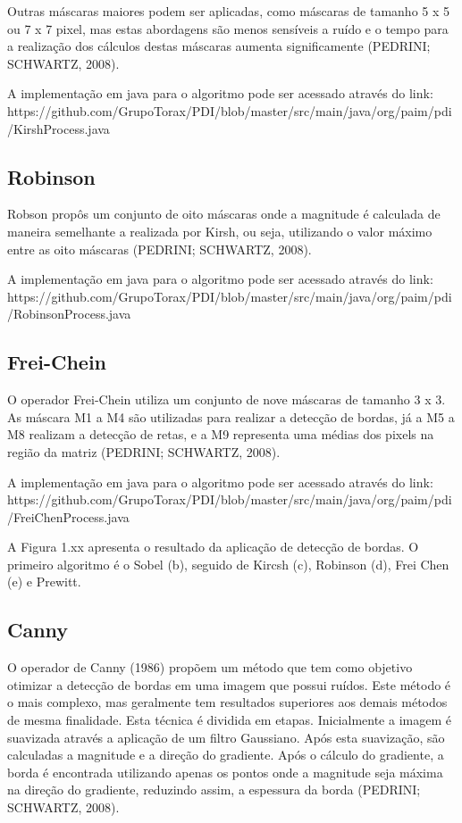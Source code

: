 \documentclass[
	12pt,				%
	oneside,			%
	a4paper,			%
	english,			%
	french,				%
	spanish,			%
	brazil,				%
	]{abntex2}
\begin{document}
Outras máscaras maiores podem ser aplicadas, como máscaras de tamanho 5 x 5 ou 7 x 7 pixel, mas estas abordagens são menos sensíveis a ruído e o tempo para a realização dos cálculos destas máscaras aumenta significamente (PEDRINI; SCHWARTZ, 2008).

A implementação em java para o algoritmo pode ser acessado através do link:
https://github.com/GrupoTorax/PDI/blob/master/src/main/java/org/paim/pdi/KirshProcess.java 

\subsection{Robinson}
Robson propôs um conjunto de oito máscaras onde a magnitude é calculada de maneira semelhante a realizada por Kirsh, ou seja, utilizando o valor máximo entre as oito máscaras (PEDRINI; SCHWARTZ, 2008). 

 A implementação em java para o algoritmo pode ser acessado através do link:
https://github.com/GrupoTorax/PDI/blob/master/src/main/java/org/paim/pdi/RobinsonProcess.java 

\subsection{Frei-Chein}
O operador Frei-Chein utiliza um conjunto de nove máscaras de tamanho 3 x 3. As máscara M1 a M4 são utilizadas para realizar a detecção de bordas, já a M5 a M8 realizam a detecção de retas, e a M9 representa uma médias dos pixels na região da matriz (PEDRINI; SCHWARTZ, 2008). 

A implementação em java para o algoritmo pode ser acessado através do link:
https://github.com/GrupoTorax/PDI/blob/master/src/main/java/org/paim/pdi/FreiChenProcess.java 

A Figura 1.xx apresenta o resultado da aplicação de detecção de bordas. O primeiro algoritmo é o Sobel (b), seguido de Kircsh (c), Robinson (d), Frei Chen (e) e Prewitt.

\subsection{Canny}

O operador de Canny (1986) propõem um método que tem como objetivo otimizar a detecção de bordas em uma imagem que possui ruídos. Este método é o mais complexo, mas geralmente tem resultados superiores aos demais métodos de mesma finalidade. Esta técnica é dividida em etapas. Inicialmente a imagem é suavizada através a aplicação de um filtro Gaussiano. Após esta suavização, são calculadas a magnitude e a direção do gradiente. Após o cálculo do gradiente, a borda é encontrada utilizando apenas os pontos onde a magnitude seja máxima na direção do gradiente, reduzindo assim, a espessura da borda (PEDRINI; SCHWARTZ, 2008).
\end{document}
